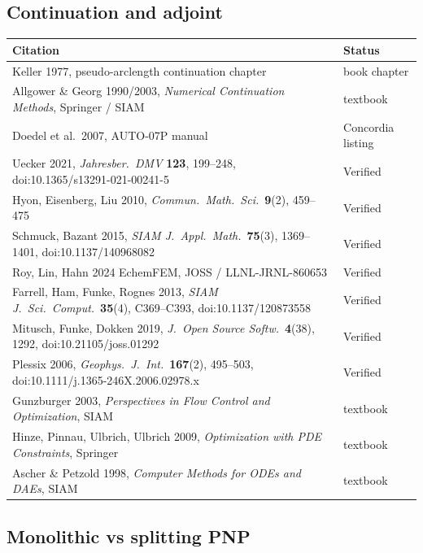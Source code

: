 \documentclass[11pt]{article}
\begin{document}
\subsection{Continuation and adjoint}

\begingroup
\small
\setlength{\tabcolsep}{4pt}
\renewcommand{\arraystretch}{1.2}
\begin{longtable}{@{}p{} p{}@{}}
\toprule
\textbf{Citation} & \textbf{Status} \\
\midrule
\endhead
Keller 1977, pseudo-arclength continuation chapter & book chapter \\
Allgower \& Georg 1990/2003, \emph{Numerical Continuation Methods},
Springer / SIAM & textbook \\
Doedel et al.\ 2007, AUTO-07P manual & Concordia listing \\
Uecker 2021, \emph{Jahresber.~DMV} \textbf{123}, 199--248,
doi:10.1365/s13291-021-00241-5 & Verified \\
Hyon, Eisenberg, Liu 2010, \emph{Commun.~Math.~Sci.}\ \textbf{9}(2), 459--475 &
Verified \\
Schmuck, Bazant 2015, \emph{SIAM J.~Appl.~Math.}\ \textbf{75}(3), 1369--1401,
doi:10.1137/140968082 & Verified \\
Roy, Lin, Hahn 2024 EchemFEM, JOSS / LLNL-JRNL-860653 & Verified \\
Farrell, Ham, Funke, Rognes 2013, \emph{SIAM J.~Sci.~Comput.}\ \textbf{35}(4),
C369--C393, doi:10.1137/120873558 & Verified \\
Mitusch, Funke, Dokken 2019, \emph{J.~Open Source Softw.}\ \textbf{4}(38),
1292, doi:10.21105/joss.01292 & Verified \\
Plessix 2006, \emph{Geophys.~J.~Int.}\ \textbf{167}(2), 495--503,
doi:10.1111/j.1365-246X.2006.02978.x & Verified \\
Gunzburger 2003, \emph{Perspectives in Flow Control and Optimization}, SIAM &
textbook \\
Hinze, Pinnau, Ulbrich, Ulbrich 2009, \emph{Optimization with PDE Constraints},
Springer & textbook \\
Ascher \& Petzold 1998, \emph{Computer Methods for ODEs and DAEs}, SIAM &
textbook \\
\bottomrule
\end{longtable}
\endgroup

\subsection{Monolithic vs splitting PNP}
\end{document}
